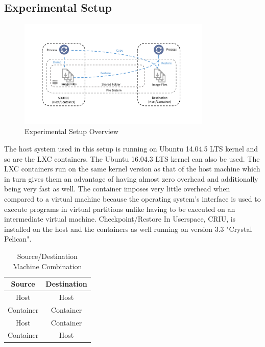 \documentclass[conference]{IEEEtran}
\begin{document}
\subsection{Experimental Setup}
\label{subsec: 3b. Experimental Setup}

\begin{figure}[h!]
\centering
 \includegraphics[width = 9.2cm]{Experiment.pdf}
 \caption{Experimental Setup Overview}
 \label{fig 1: CRIU}
\end{figure}

The host system used in this setup is running on Ubuntu 14.04.5 LTS kernel and so are the LXC containers. The Ubuntu 16.04.3 LTS kernel can also be used. The LXC containers run on the same kernel version as that of the host machine which in turn gives them an advantage of having almost zero overhead and additionally being very fast as well. The container imposes very little overhead when compared to a virtual machine \cite{Ann2015PerformanceMachines} because the operating system's interface is used to execute programs in virtual partitions unlike having to be executed on an intermediate virtual machine. Checkpoint/Restore In Userspace, CRIU, is installed on the host and the containers as well running on version 3.3 "Crystal Pelican".

\begin{table}[htbp]
\caption{Source/Destination Machine Combination}
\begin{center}
\begin{tabular}{|c|c|}
\hline
\textbf{Source}&\textbf{Destination} \\
\cline{1-2} 
\hline
Host & Host  \\
\hline
Container & Container  \\
\hline
Host & Container \\
\hline
Container & Host \\
\hline
\end{tabular}
\label{table 1}
\end{center}
\end{table}
\end{document}
